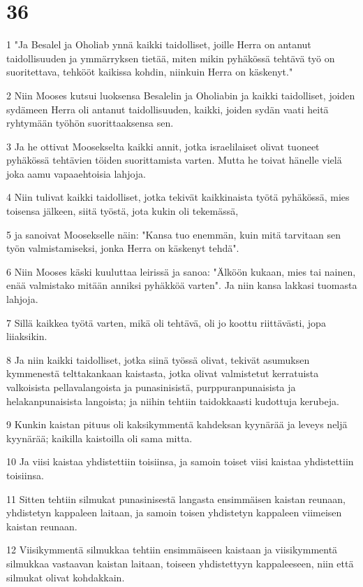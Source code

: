 \chapter{36}

\par 1 "Ja Besalel ja Oholiab ynnä kaikki taidolliset, joille Herra on antanut taidollisuuden ja ymmärryksen tietää, miten mikin pyhäkössä tehtävä työ on suoritettava, tehkööt kaikissa kohdin, niinkuin Herra on käskenyt."
\par 2 Niin Mooses kutsui luoksensa Besalelin ja Oholiabin ja kaikki taidolliset, joiden sydämeen Herra oli antanut taidollisuuden, kaikki, joiden sydän vaati heitä ryhtymään työhön suorittaaksensa sen.
\par 3 Ja he ottivat Moosekselta kaikki annit, jotka israelilaiset olivat tuoneet pyhäkössä tehtävien töiden suorittamista varten. Mutta he toivat hänelle vielä joka aamu vapaaehtoisia lahjoja.
\par 4 Niin tulivat kaikki taidolliset, jotka tekivät kaikkinaista työtä pyhäkössä, mies toisensa jälkeen, siitä työstä, jota kukin oli tekemässä,
\par 5 ja sanoivat Moosekselle näin: "Kansa tuo enemmän, kuin mitä tarvitaan sen työn valmistamiseksi, jonka Herra on käskenyt tehdä".
\par 6 Niin Mooses käski kuuluttaa leirissä ja sanoa: "Älköön kukaan, mies tai nainen, enää valmistako mitään anniksi pyhäkköä varten". Ja niin kansa lakkasi tuomasta lahjoja.
\par 7 Sillä kaikkea työtä varten, mikä oli tehtävä, oli jo koottu riittävästi, jopa liiaksikin.
\par 8 Ja niin kaikki taidolliset, jotka siinä työssä olivat, tekivät asumuksen kymmenestä telttakankaan kaistasta, jotka olivat valmistetut kerratuista valkoisista pellavalangoista ja punasinisistä, purppuranpunaisista ja helakanpunaisista langoista; ja niihin tehtiin taidokkaasti kudottuja kerubeja.
\par 9 Kunkin kaistan pituus oli kaksikymmentä kahdeksan kyynärää ja leveys neljä kyynärää; kaikilla kaistoilla oli sama mitta.
\par 10 Ja viisi kaistaa yhdistettiin toisiinsa, ja samoin toiset viisi kaistaa yhdistettiin toisiinsa.
\par 11 Sitten tehtiin silmukat punasinisestä langasta ensimmäisen kaistan reunaan, yhdistetyn kappaleen laitaan, ja samoin toisen yhdistetyn kappaleen viimeisen kaistan reunaan.
\par 12 Viisikymmentä silmukkaa tehtiin ensimmäiseen kaistaan ja viisikymmentä silmukkaa vastaavan kaistan laitaan, toiseen yhdistettyyn kappaleeseen, niin että silmukat olivat kohdakkain.
